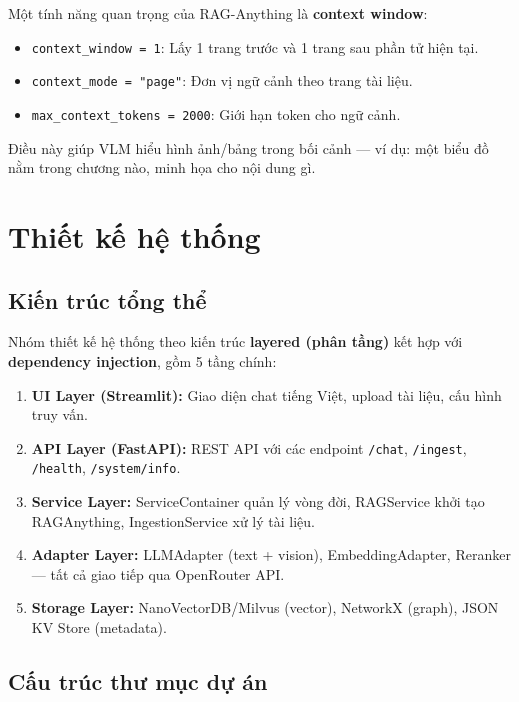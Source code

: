 \documentclass[12pt,a4paper]{article}
\begin{document}
Một tính năng quan trọng của RAG-Anything là \textbf{context window}:

\begin{itemize}
  \item \texttt{context\_window = 1}: Lấy 1 trang trước và 1 trang sau phần tử hiện tại.
  \item \texttt{context\_mode = "page"}: Đơn vị ngữ cảnh theo trang tài liệu.
  \item \texttt{max\_context\_tokens = 2000}: Giới hạn token cho ngữ cảnh.
\end{itemize}

Điều này giúp VLM hiểu hình ảnh/bảng trong bối cảnh --- ví dụ: một biểu đồ nằm trong chương nào, minh họa cho nội dung gì.

\section{Thiết kế hệ thống}

\subsection{Kiến trúc tổng thể}

Nhóm thiết kế hệ thống theo kiến trúc \textbf{layered (phân tầng)} kết hợp với \textbf{dependency injection}, gồm 5 tầng chính:

\begin{enumerate}
  \item \textbf{UI Layer (Streamlit):} Giao diện chat tiếng Việt, upload tài liệu, cấu hình truy vấn.
  \item \textbf{API Layer (FastAPI):} REST API với các endpoint \texttt{/chat}, \texttt{/ingest}, \texttt{/health}, \texttt{/system/info}.
  \item \textbf{Service Layer:} ServiceContainer quản lý vòng đời, RAGService khởi tạo RAGAnything, IngestionService xử lý tài liệu.
  \item \textbf{Adapter Layer:} LLMAdapter (text + vision), EmbeddingAdapter, Reranker --- tất cả giao tiếp qua OpenRouter API.
  \item \textbf{Storage Layer:} NanoVectorDB/Milvus (vector), NetworkX (graph), JSON KV Store (metadata).
\end{enumerate}

\subsection{Cấu trúc thư mục dự án}
\end{document}
